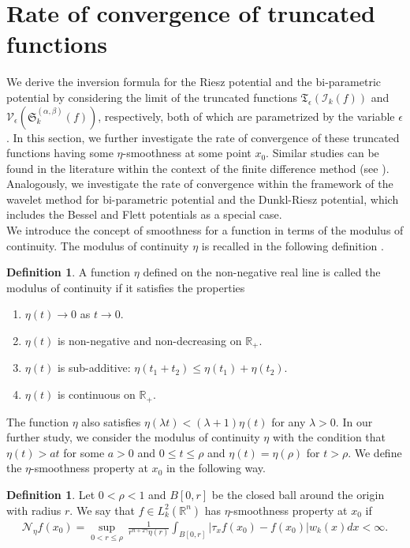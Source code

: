 \documentclass[11pt,a4paper,reqno]{amsproc}
\theoremstyle{definition}
\newtheorem{definition}[theorem]{Definition}
\theoremstyle{remark}
\numberwithin{equation}{section}
\begin{document}
\section{Rate of convergence of truncated functions} \label{S:5}
We derive the inversion formula for the Riesz potential and the bi-parametric potential by considering the limit of the truncated functions  $\mathfrak{T}_\epsilon(\mathcal{I}_k(f))$ and $\mathcal{V}_\epsilon\left( \mathfrak{S}_k^{(\alpha,\beta)}(f) \right)$, respectively, both of which are parametrized by the variable $\epsilon$. In this section, we further investigate the rate of convergence of these truncated functions having some $\eta$-smoothness at some point $x_0$. Similar studies can be found in the literature within the context of the finite difference method  (see \cite{Aliev-2014, Aliev-2013, Bayrakci-2020, Bayrakci, Eryigit}). Analogously, we investigate the rate of convergence within the framework of the wavelet method for bi-parametric potential and the Dunkl-Riesz potential, which includes the Bessel and Flett potentials as a special case.\\
We introduce the concept of smoothness for a function in terms of the modulus of continuity. The modulus of continuity 
$\eta$ is recalled in the following definition \cite{Devore}.
  \begin{definition}
      A function $\eta$ defined on the non-negative real line is called the modulus of continuity if it satisfies the properties
      \begin{enumerate}[$(i)$]
          \item $\eta(t) \rightarrow 0$ as $t \rightarrow 0$.
          \item  $\eta(t)$ is non-negative and non-decreasing on $\mathbb{R}_+$.
          \item  $\eta(t) $ is sub-additive: $\eta(t_1+t_2)\leq \eta(t_1)+\eta(t_2)$.
          \item  $\eta(t) $ is continuous on $\mathbb{R}_+$.
      \end{enumerate}
  \end{definition}
The function $\eta$ also satisfies $\eta(\lambda t)<(\lambda+1)\eta(t)$ for any $\lambda >0$. In our further study, we consider the modulus of continuity $\eta$ with the condition that $\eta(t)>at$ for some $a>0$ and $0\leq t \leq \rho$ and $\eta(t)=\eta(\rho)$ for $t> \rho$.
We define the $\eta$-smoothness property at $x_0$ in the following way.
\begin{definition}
Let $0< \rho < 1$ and $B[0,r]$ be the closed ball around the origin with radius $r$.  We say that  $f\in L_k^{2}(\mathbb{R}^n)$ has $\eta$-smoothness property at $x_0$ if 
       \begin{align} \label{smoothness-1}
            \mathcal{N}_{\eta}f(x_0) = \underset{0<r\leq \rho}{\sup} \, \frac{1}{r^{n+2\gamma}\eta(r)} \int_{B[0,r]} |\tau_{x}f(x_0)-f(x_0)|w_k(x)dx < \infty.
       \end{align} 

\end{definition}
\end{document}
